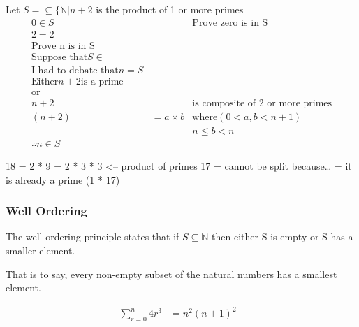Let $S = \subseteq \{ \mathbb{N} | n+2$ is the product of 1 or more primes \\
\begin{align}
  0 \in S && \text{Prove zero is in S}\\
  2 = 2 && \\
  \text{Prove n is in S} && \\
  \text{Suppose that} S \in && \\
  \text{I had to debate that} n = S && \\
  \text{Either} n + 2 \text{is a prime} && \\
  \text{or} && \\
  n + 2 && \text{is composite of 2 or more primes} \\
  (n + 2) & = a \times b & \text{where} (0 < a, b < n+1) \\
  && n \leq b < n \\
  \therefore n \in S &&
\end{align}

18 = 2 * 9
   = 2 * 3 * 3 <-- product of primes
17 = cannot be split because\ldots
   = it is already a prime (1 * 17)

\subsubsection{Well Ordering}
\label{sec:WellOrdering}
The well ordering principle states that if $S \subseteq \mathbb{N}$ then
either S is empty or S has a smaller element.

That is to say, every non-empty subset of the natural numbers has a smallest
element.

\begin{align}
  \sum_{r=0}^{n} 4r^{3} & = n^{2}(n+1)^{2} & \\
\end{align}



